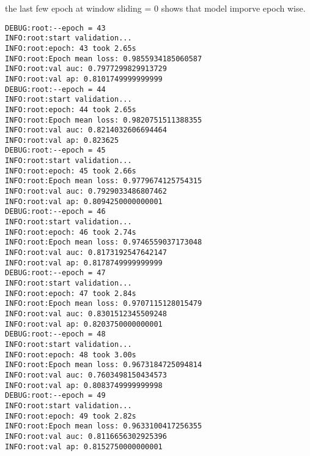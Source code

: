 \documentclass[11pt]{article}
\begin{document}
the last few epoch at window sliding = 0 shows that model imporve epoch wise.
\begin{verbatim}
DEBUG:root:--epoch = 43
INFO:root:start validation...
INFO:root:epoch: 43 took 2.65s
INFO:root:Epoch mean loss: 0.9855934185060587
INFO:root:val auc: 0.7977299829913729
INFO:root:val ap: 0.8101749999999999
DEBUG:root:--epoch = 44
INFO:root:start validation...
INFO:root:epoch: 44 took 2.65s
INFO:root:Epoch mean loss: 0.9820751511388355
INFO:root:val auc: 0.8214032606694464
INFO:root:val ap: 0.823625
DEBUG:root:--epoch = 45
INFO:root:start validation...
INFO:root:epoch: 45 took 2.66s
INFO:root:Epoch mean loss: 0.9779674125754315
INFO:root:val auc: 0.7929033486807462
INFO:root:val ap: 0.8094250000000001
DEBUG:root:--epoch = 46
INFO:root:start validation...
INFO:root:epoch: 46 took 2.74s
INFO:root:Epoch mean loss: 0.9746559037173048
INFO:root:val auc: 0.8173192547642147
INFO:root:val ap: 0.8178749999999999
DEBUG:root:--epoch = 47
INFO:root:start validation...
INFO:root:epoch: 47 took 2.84s
INFO:root:Epoch mean loss: 0.9707115128015479
INFO:root:val auc: 0.8301512345509248
INFO:root:val ap: 0.8203750000000001
DEBUG:root:--epoch = 48
INFO:root:start validation...
INFO:root:epoch: 48 took 3.00s
INFO:root:Epoch mean loss: 0.9673184725094814
INFO:root:val auc: 0.7603498150434573
INFO:root:val ap: 0.8083749999999998
DEBUG:root:--epoch = 49
INFO:root:start validation...
INFO:root:epoch: 49 took 2.82s
INFO:root:Epoch mean loss: 0.9633100417256355
INFO:root:val auc: 0.8116656302925396
INFO:root:val ap: 0.8152750000000001
\end{verbatim}
\end{document}
